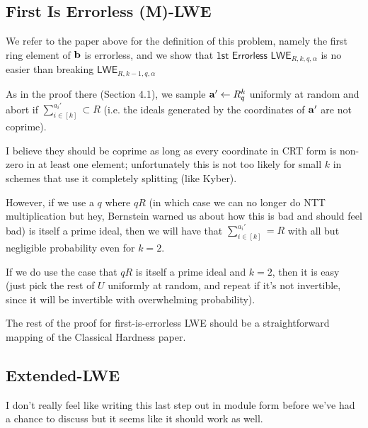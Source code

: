 \documentclass[oribibl,envcountsect,envcountsame]{llncs}
\begin{document}
\subsection{First Is Errorless (M)-LWE}
\label{sec:first-errorless-m-lwe}

We refer to the paper above for the definition of this problem, namely the first ring element of 
$\mathbf{b}$ is errorless, and we show that $\textsf{1st Errorless LWE}_{R,k,q,\alpha}$ is no easier than breaking 
$\textsf{LWE}_{R,k-1,q,\alpha}$

As in the proof there (Section 4.1), we sample $\mathbf{a}' \gets R_q^{k}$ 
uniformly at random and abort if $\sum_{i \in [k]}^{a_i'} \subset R$ (i.e. the ideals 
generated by the coordinates of $\mathbf{a}'$ are not coprime).

I believe they should be coprime as long as every coordinate in CRT form is non-zero 
in at least one element; unfortunately this is not too likely for small $k$ 
in schemes that use it completely splitting (like Kyber). 

However, if we use a $q$ where $qR$ (in which case we can no longer do NTT multiplication 
but hey, Bernstein warned us about how this is bad and should feel bad)
is itself a prime ideal, then we will have that $\sum_{i \in [k]}^{a_i'} = R$ with 
all but negligible probability even for $k=2$. 


If we do use the case that $qR$ is itself a prime ideal and $k=2$, then it is easy 
(just pick the rest of $U$ uniformly at random, and repeat if it's not invertible, since 
it will be invertible with overwhelming probability). 

The rest of the proof for first-is-errorless LWE should be a straightforward mapping of the 
Classical Hardness paper.

\subsection{Extended-LWE}

I don't really feel like writing this last step out in module form before we've had a chance to discuss
but it seems like it should work as well. 










\end{document}
